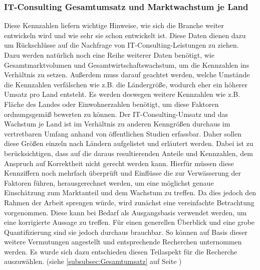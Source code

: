 \subsubsection{IT-Consulting Gesamtumsatz und Marktwachstum je Land}
Diese Kennzahlen liefern wichtige Hinweise, wie sich die Branche weiter entwickeln wird und wie sehr sie schon entwickelt ist. 
Diese Daten dienen dazu um Rückschlüsse auf die Nachfrage von IT-Consulting-Leistungen zu ziehen. 
Dazu werden natürlich noch eine Reihe weiterer Daten benötigt, wie Gesamtmarktvolumen und Gesamtwirtschaftswachstum, um die Kennzahlen ins Verhältnis zu setzen.
 Außerdem muss darauf geachtet werden, welche Umstände die Kennzahlen verfälschen wie z.B. die Ländergröße, wodurch eher ein höherer Umsatz pro Land entsteht. 
 Es werden deswegen weitere Kennzahlen wie z.B. Fläche des Landes oder Einwohnerzahlen benötigt, um diese Faktoren ordnungsgemäß bewerten zu können.
Der IT-Consulting-Umsatz und das Wachstum je Land ist im Verhältnis zu anderen Kenngrößen durchaus im vertretbaren Umfang anhand von öffentlichen Studien erfassbar.  
Daher sollen diese Größen einzeln nach Ländern aufgelistet und erläutert werden. 
 Dabei ist zu berücksichtigen, dass auf die daraus resultierenden Anteile und Kennzahlen, dem Anspruch auf Korrektheit nicht gerecht werden kann. 
 Hierfür müssen diese Kennziffern noch mehrfach überprüft und Einflüsse die zur Verwässerung der Faktoren führen, herausgerechnet werden, um eine möglichst genaue Einschätzung zum Marktanteil und dem Wachstum zu treffen. Da dies jedoch den Rahmen der Arbeit sprengen würde, wird zunächst eine vereinfachte Betrachtung vorgenommen. Diese kann bei Bedarf als Ausgangsbasis  verwendet werden, um eine korrigierte Aussage zu treffen. 
 Für einen generellen Überblick und eine grobe Quantifizierung sind sie jedoch durchaus brauchbar. So können auf Basis dieser weitere Vermutungen angestellt und entsprechende Recherchen unternommen werden.
Es wurde sich dazu entschieden diesen Teilaspekt für die Recherche auszuwählen. (siehe  \ref{subsubsec:Gesamtumsatz}  auf Seite \pageref{subsubsec:Gesamtumsatz})



